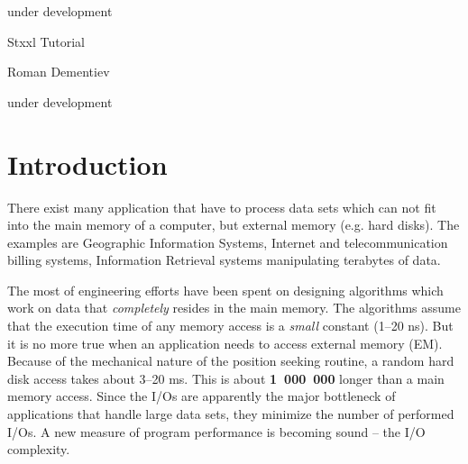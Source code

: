 \documentclass[twoside]{book}
\newcommand{\stxxl}{{\sc Stxxl} }
\begin{document}

%
\setcounter{page}{-2}%
\begin{titlepage}%
under development
\large
\vspace*{1cm}
\vspace*{1cm}
\vspace*{1cm}
\begin{center}
{\huge \stxxl Tutorial}\\

\vspace{3mm}

{\LARGE Roman Dementiev\\[2mm]}

\vspace*{\fill}

{\normalsize under development}
\end{center}
\thispagestyle{empty}
\end{titlepage}


\thispagestyle{empty}


\setcounter{tocdepth}{1}
\tableofcontents
\clearpage
{}
\setcounter{page}{1}


\chapter{Introduction}

There exist many application that have to process data sets which
can not fit into the main memory of a computer, but external memory
(e.g. hard disks). The examples are Geographic Information
Systems, Internet and telecommunication billing
systems, Information Retrieval systems
manipulating terabytes of data. 

The most of engineering efforts have been spent on designing
algorithms which work on data that \emph{completely} resides in the main
memory. The algorithms assume that the execution time of any
memory access is a \emph{small} constant (1--20 ns). But it is no more
true when 
an application needs to access external memory (EM). Because of the
mechanical nature of the position seeking routine, a random hard disk
access takes about 3--20 ms. This 
is about {\bf 1~000~000} longer than a main memory access. Since the I/Os
are apparently the major bottleneck of applications that handle large
data sets, they minimize the number of performed I/Os.
A new measure of program performance is becoming sound -- the I/O
complexity. 
\end{document}
